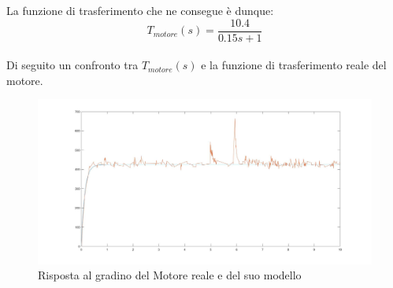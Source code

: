 La funzione di trasferimento che ne consegue è dunque:
\\
$$
T_{motore}(s)=\displaystyle\frac{10.4}{0.15s+1}
$$
\\
Di seguito un confronto tra $T_{motore}(s)$ e la funzione di trasferimento reale del motore.
\begin{figure}[ht]
	\centering
	\includegraphics[width=\textwidth]{modMotorvsReale.jpg}
	\caption{Risposta al gradino del Motore reale e del suo modello}
	\label{modMotorvsReale}
\end{figure}

